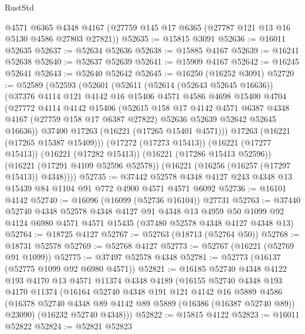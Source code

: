 \begin{lexlean}{RustStd}
\begin{coremodule}
    @4571
    @6365
    @4348
    @4167
    (@27759 @145 @17 @6365 (@27787 @121 @13 @16 @5130 @4586 @27803 @27821))
@52635 := @15815 @3091
@52636 := @16011 @52635
@52637 := @52634 @52636
@52638 := @15885 @4167
@52639 := @16241 @52638
@52640 := @52637 @52639
@52641 := @15909 @4167
@52642 := @16245 @52641
@52643 := @52640 @52642
@52645 := @16250 (@16252 @3091)
@52720 := @52589
    (@52593
      (@52601
        (@52611
          (@52614 (@52643 @52645 @16636))
          (@37376
            @4114
            @121
            @4142
            @16
            @15406
            @4571
            @4586
            @4698
            @15400
            @4704
            (@27772
              @4114
              @4142
              @15406
              (@52615
                @158
                @17
                @4142
                @4571
                @6387
                @4348
                @4167
                (@27759 @158 @17 @6387 @27822)
                @52636
                @52639
                @52642
                @52645
                @16636))
            @37400
            @17263
            (@16221 (@17265 @15401 @4571)))
          @17263
          (@16221 (@17265 @15387 @15409)))
        (@17272 (@17273 @15413))
        (@16221 (@17277 @15413))
        (@16221 (@17282 @15413))
        (@16221 (@17286 @15413 @52596))
        (@16221 (@17291 @4109 @52596 @52578))
        (@16221 (@16256 (@16257 (@17297 @15413)) @4348))))
@52735 := @37442 @52578 @4348 @4127 @243 @4348 @13 @15439 @84 @1104 @91 @772 @4900 @4571 @4571 @6092
@52736 := @16101 @4142
@52740 := @16096 (@16099 (@52736 @16104)) @27731
@52763 := @37440
    @52740
    @4348
    @52578
    @4348
    @4127
    @91
    @4348
    @13
    @4959
    @50
    @1099
    @92
    @4124
    @6980
    @4571
    @4571
    @15435
    (@37480 @52578 @4348 @4127 @4348 @13)
@52764 := @18725 @4127
@52767 := @52763 (@18713 (@52764 @50))
@52768 := @18731 @52578
@52769 := @52768 @4127
@52773 := @52767 (@16221 (@52769 @91 @1099))
@52775 := @37497 @52578 @4348
@52781 := @52773 (@16137 (@52775 @1099 @92 @6980 @4571))
@52821 := @16185
    @52740
    @4348
    @4122
    @193
    @4170
    @13
    @4571
    @11374
    @4348
    @4189
    (@16155
      @52740
      @4348
      @193
      @4170
      @11374
      (@16164
        @52740
        @4348
        @191
        @121
        @4142
        @16
        @5889
        @4586
        (@16378 @52740 @4348 @89 @4142 @89 @5889 (@16386 (@16387 @52740 @89)) @23090)
        (@16232 @52740 @4348)))
@52822 := @15815 @4122
@52823 := @16011 @52822
@52824 := @52821 @52823

\end{coremodule}
\end{lexlean}
